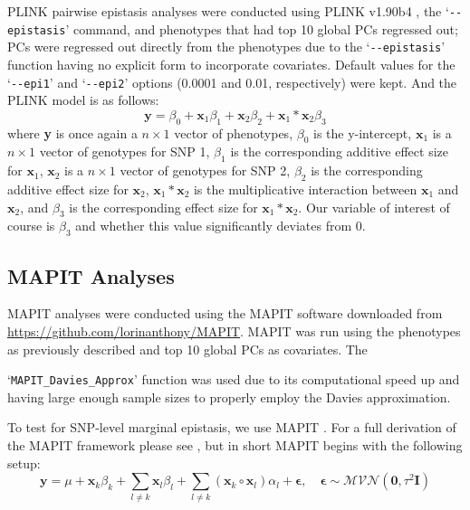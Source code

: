\documentclass[12pt,a4paper]{article}
\begin{document}
PLINK pairwise epistasis analyses were conducted using PLINK v1.90b4 \citep{Purcell2007}, the `\texttt{-{}-epistasis}' command, and phenotypes that had top 10 global PCs regressed out; PCs were regressed out directly from the phenotypes due to the `\texttt{-{}-epistasis}' function having no explicit form to incorporate covariates. Default values for the `\texttt{-{}-epi1}' and `\texttt{-{}-epi2}' options (0.0001 and 0.01, respectively) were kept. And the PLINK model is as follows:
\begin{equation}
\textbf{y} = \beta_0 + \textbf{x}_1\beta_1 + \textbf{x}_2\beta_2 + \textbf{x}_1*\textbf{x}_2\beta_3    
\end{equation}
where \textbf{y} is once again a $n \times 1$ vector of phenotypes, $\beta_0$ is the y-intercept, $\textbf{x}_1$ is a $n \times 1$ vector of genotypes for SNP 1, $\beta_1$ is the corresponding additive effect size for $\textbf{x}_1$, $\textbf{x}_2$ is a $n \times 1$ vector of genotypes for SNP 2, $\beta_2$ is the corresponding additive effect size for $\textbf{x}_2$, $\textbf{x}_1 * \textbf{x}_2$ is the multiplicative interaction between $\textbf{x}_1$ and $\textbf{x}_2$, and $\beta_3$ is the corresponding effect size for $\textbf{x}_1 * \textbf{x}_2$. Our variable of interest of course is $\beta_3$ and whether this value significantly deviates from 0.  

\subsection{MAPIT Analyses}

MAPIT analyses were conducted using the MAPIT software downloaded from \url{https://github.com/lorinanthony/MAPIT}. MAPIT was run using the phenotypes as previously described and top 10 global PCs as covariates. The 

\noindent `\texttt{MAPIT\_Davies\_Approx}' function was used due to its computational speed up and having large enough sample sizes to properly employ the Davies approximation. 

To test for SNP-level marginal epistasis, we use MAPIT \citep{Crawford2017}. For a full derivation of the MAPIT framework please see \citet{Crawford2017}, but in short MAPIT begins with the following setup:
\begin{equation}
\textbf{y} = \mu + \textbf{x}_k\beta_k + \sum_{l \neq k} \textbf{x}_l\beta_l + \sum_{l \neq k} (\textbf{x}_k \circ \textbf{x}_l)\alpha_l + \boldsymbol{\epsilon}, \quad \boldsymbol{\epsilon} \sim \mathcal{MVN}(\textbf{0}, \tau^{2}\textbf{I})  
\end{equation}
\end{document}
